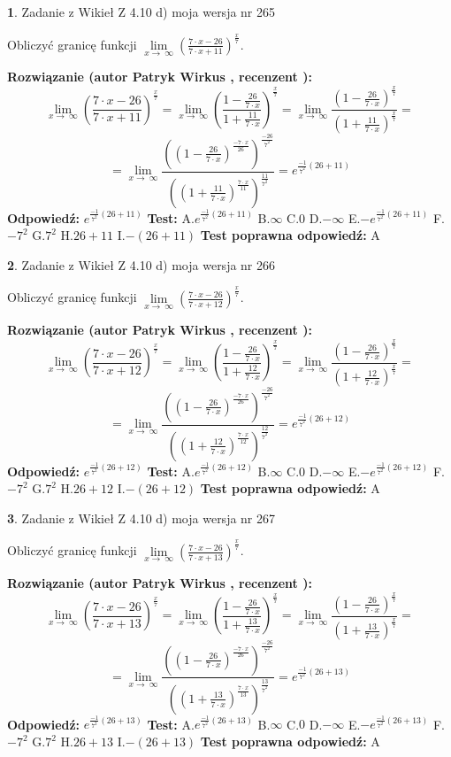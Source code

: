 \documentclass[12pt, a4paper]{article}
\theoremstyle{definition} %
\newtheorem{zad}{}
\newcommand{\zadStart}[1]{\begin{zad}#1\newline}
\newcommand{\zadStop}{\end{zad}}
\newcommand{\rozwStart}[2]{\noindent \textbf{Rozwiązanie (autor #1 , recenzent #2): }\newline}
\newcommand{\rozwStop}{\newline}
\newcommand{\odpStart}{\noindent \textbf{Odpowiedź:}\newline}
\newcommand{\odpStop}{\newline}
\newcommand{\testStart}{\noindent \textbf{Test:}\newline}
\newcommand{\testStop}{\newline}
\newcommand{\kluczStart}{\noindent \textbf{Test poprawna odpowiedź:}\newline}
\newcommand{\kluczStop}{\newline}
\begin{document}
\zadStart{Zadanie z Wikieł Z 4.10 d) moja wersja nr 265}


Obliczyć granicę funkcji  $\lim\limits_{x\to\ \infty}(\frac{7\cdot x-26}{7\cdot x+11})^{\frac{x}{7}}$.
\zadStop
\rozwStart{Patryk Wirkus}{}
$$\lim\limits_{x\to\ \infty}(\frac{7\cdot x-26}{7\cdot x+11})^{\frac{x}{7}} = \lim\limits_{x\to\ \infty}(\frac{1-\frac{26}{7\cdot x}}{1+\frac{11}{7\cdot x}})^{\frac{x}{7}}=\lim\limits_{x\to\ \infty}\frac{(1-\frac{26}{7\cdot x})^{\frac{x}{7}}}{(1+\frac{11}{7\cdot x})^{\frac{x}{7}}}=$$
$$=\lim\limits_{x\to\ \infty}\frac{((1-\frac{26}{7\cdot x})^{\frac{-7\cdot x}{26}})^{\frac{-26}{7^{2}}}}{((1+\frac{11}{7\cdot x})^{\frac{7\cdot x}{11}})^{\frac{11}{7^{2}}}}=e^{\frac{-1}{7^{2}}(26+11)}$$
\rozwStop
\odpStart
$e^{\frac{-1}{7^{2}}(26+11)}$
\odpStop
\testStart
A.$e^{\frac{-1}{7^{2}}(26+11)}$ B.$\infty$ C.$0$ D.$-\infty$ E.$-e^{\frac{-1}{7^{2}}(26+11)}$
F.$-7^{2}$ G.$7^{2}$
H.$26+11$
I.$-(26+11)$
\testStop
\kluczStart
A
\kluczStop



\zadStart{Zadanie z Wikieł Z 4.10 d) moja wersja nr 266}


Obliczyć granicę funkcji  $\lim\limits_{x\to\ \infty}(\frac{7\cdot x-26}{7\cdot x+12})^{\frac{x}{7}}$.
\zadStop
\rozwStart{Patryk Wirkus}{}
$$\lim\limits_{x\to\ \infty}(\frac{7\cdot x-26}{7\cdot x+12})^{\frac{x}{7}} = \lim\limits_{x\to\ \infty}(\frac{1-\frac{26}{7\cdot x}}{1+\frac{12}{7\cdot x}})^{\frac{x}{7}}=\lim\limits_{x\to\ \infty}\frac{(1-\frac{26}{7\cdot x})^{\frac{x}{7}}}{(1+\frac{12}{7\cdot x})^{\frac{x}{7}}}=$$
$$=\lim\limits_{x\to\ \infty}\frac{((1-\frac{26}{7\cdot x})^{\frac{-7\cdot x}{26}})^{\frac{-26}{7^{2}}}}{((1+\frac{12}{7\cdot x})^{\frac{7\cdot x}{12}})^{\frac{12}{7^{2}}}}=e^{\frac{-1}{7^{2}}(26+12)}$$
\rozwStop
\odpStart
$e^{\frac{-1}{7^{2}}(26+12)}$
\odpStop
\testStart
A.$e^{\frac{-1}{7^{2}}(26+12)}$ B.$\infty$ C.$0$ D.$-\infty$ E.$-e^{\frac{-1}{7^{2}}(26+12)}$
F.$-7^{2}$ G.$7^{2}$
H.$26+12$
I.$-(26+12)$
\testStop
\kluczStart
A
\kluczStop



\zadStart{Zadanie z Wikieł Z 4.10 d) moja wersja nr 267}


Obliczyć granicę funkcji  $\lim\limits_{x\to\ \infty}(\frac{7\cdot x-26}{7\cdot x+13})^{\frac{x}{7}}$.
\zadStop
\rozwStart{Patryk Wirkus}{}
$$\lim\limits_{x\to\ \infty}(\frac{7\cdot x-26}{7\cdot x+13})^{\frac{x}{7}} = \lim\limits_{x\to\ \infty}(\frac{1-\frac{26}{7\cdot x}}{1+\frac{13}{7\cdot x}})^{\frac{x}{7}}=\lim\limits_{x\to\ \infty}\frac{(1-\frac{26}{7\cdot x})^{\frac{x}{7}}}{(1+\frac{13}{7\cdot x})^{\frac{x}{7}}}=$$
$$=\lim\limits_{x\to\ \infty}\frac{((1-\frac{26}{7\cdot x})^{\frac{-7\cdot x}{26}})^{\frac{-26}{7^{2}}}}{((1+\frac{13}{7\cdot x})^{\frac{7\cdot x}{13}})^{\frac{13}{7^{2}}}}=e^{\frac{-1}{7^{2}}(26+13)}$$
\rozwStop
\odpStart
$e^{\frac{-1}{7^{2}}(26+13)}$
\odpStop
\testStart
A.$e^{\frac{-1}{7^{2}}(26+13)}$ B.$\infty$ C.$0$ D.$-\infty$ E.$-e^{\frac{-1}{7^{2}}(26+13)}$
F.$-7^{2}$ G.$7^{2}$
H.$26+13$
I.$-(26+13)$
\testStop
\kluczStart
A
\kluczStop
\end{document}
